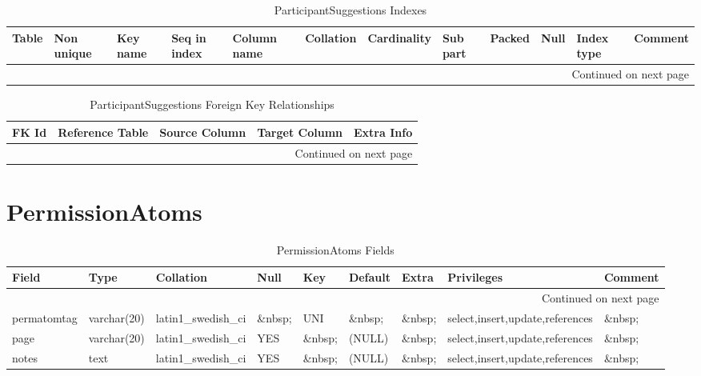 \documentclass[tablesignature,landscape]{scrartcl}
\begin{document}
\begin{longtable}{|l|l|l|l|l|l|l|l|l|l|l|l|}
\caption{ParticipantSuggestions Indexes} \label{tbl:participantsuggestionsindexes}\\
\hline
 Table                   &  Non unique  &  Key name  &  Seq in index  &  Column name  &  Collation  &  Cardinality  &  Sub part  &  Packed  &  Null     &  Index type  &  Comment \\
\hline
\endhead
\hline\multicolumn{12}{r}{Continued on next page}\
\endfoot
\endlastfoot
\hline
 ParticipantSuggestions  &           0  &  PRIMARY   &             1  &  badgeid      &  A          &            1  &  (NULL)    &  (NULL)  &  \&nbsp;  &  BTREE       &  \&nbsp;  \\
\hline
\end{longtable}


\begin{longtable}{|l|l|l|l|l|}
\caption{ParticipantSuggestions Foreign Key Relationships} \label{tbl:participantsuggestionsfkr}\\
\hline
 FK Id                                &  Reference Table  &  Source Column  &  Target Column  &  Extra Info \\
\hline
\endhead
\hline\multicolumn{5}{r}{Continued on next page}\
\endfoot
\endlastfoot
\hline
 ParticipantSuggestions\_{}ibfk\_{}1  &  Participants     &  `badgeid`      &  `badgeid`      &              \\
\hline
\end{longtable}
\section{PermissionAtoms}
\label{sec-13}


\begin{longtable}{|l|l|l|l|l|l|l|l|l|}
\caption{PermissionAtoms Fields} \label{tbl:permissionatomsfields}\\
\hline
 Field        &  Type         &  Collation                &  Null     &  Key      &  Default  &  Extra              &  Privileges                       &  Comment \\
\hline
\endhead
\hline\multicolumn{9}{r}{Continued on next page}\
\endfoot
\endlastfoot
\hline
 permatomid   &  int(11)      &  NULL                     &  \&nbsp;  &  PRI      &  (NULL)   &  auto\_{}increment  &  select,insert,update,references  &  \&nbsp;  \\
 permatomtag  &  varchar(20)  &  latin1\_{}swedish\_{}ci  &  \&nbsp;  &  UNI      &  \&nbsp;  &  \&nbsp;            &  select,insert,update,references  &  \&nbsp;  \\
 page         &  varchar(20)  &  latin1\_{}swedish\_{}ci  &  YES      &  \&nbsp;  &  (NULL)   &  \&nbsp;            &  select,insert,update,references  &  \&nbsp;  \\
 notes        &  text         &  latin1\_{}swedish\_{}ci  &  YES      &  \&nbsp;  &  (NULL)   &  \&nbsp;            &  select,insert,update,references  &  \&nbsp;  \\
\hline
\end{longtable}
\end{document}
